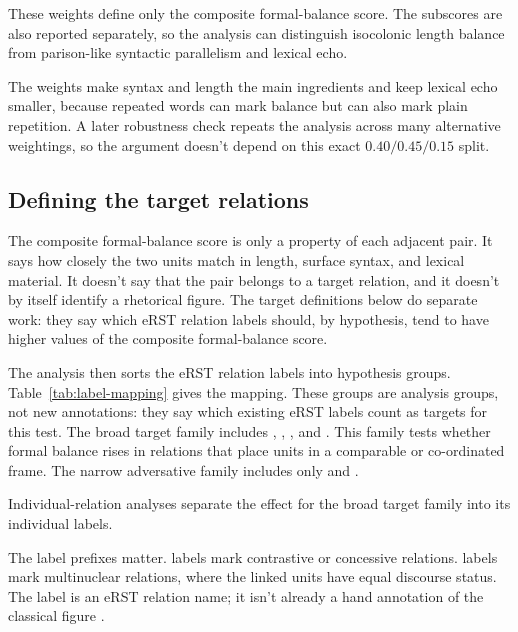 \documentclass[12pt]{article}
\begin{document}
These weights define only the composite formal-balance score. The subscores are also reported
separately, so the analysis can distinguish
isocolonic length balance from parison-like syntactic parallelism and
lexical echo.

The weights make syntax and length the main ingredients and keep lexical
echo smaller, because repeated words can mark balance but can also mark
plain repetition. A later robustness check repeats the analysis across many
alternative weightings, so the argument doesn't depend on this exact
\(0.40/0.45/0.15\) split.

\subsection{Defining the target relations}

The composite formal-balance score is only a property of each adjacent
pair. It says how closely the two units match in length, surface syntax,
and lexical material. It doesn't say that the pair belongs to a target
relation, and it doesn't by itself identify a rhetorical figure. The
target definitions below do separate work: they say which eRST relation
labels should, by hypothesis, tend to have higher values of the composite
formal-balance score.

The analysis then sorts the eRST relation labels into hypothesis groups.
Table~\ref{tab:label-mapping} gives the mapping. These groups are analysis
groups, not new annotations: they say which existing eRST labels count as
targets for this test. The broad target family includes
, ,
, and . This family tests
whether formal balance rises in relations that place units in a
comparable or co-ordinated frame. The narrow adversative family includes only
 and .

Individual-relation analyses separate the effect for the broad target family into
its individual labels.

The label prefixes matter.  labels mark contrastive
or concessive relations.  labels mark multinuclear
relations, where the linked units have equal discourse status. The label
 is an eRST relation name; it isn't already
a hand annotation of the classical figure .
\end{document}
